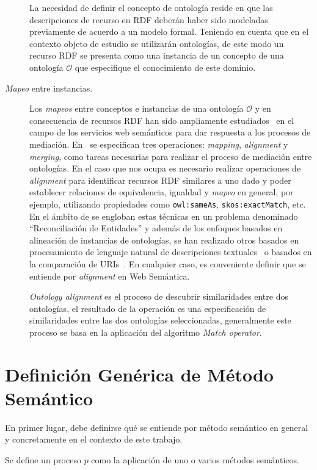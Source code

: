 \begin{description}
La necesidad de definir el concepto de ontología reside en que las descripciones de recurso en RDF deberán
haber sido modeladas previamente de acuerdo a un modelo formal. Teniendo en cuenta que en el contexto objeto de estudio se utilizarán
ontologías, de este modo un recurso RDF se presenta como una instancia de un concepto de una ontología $\mathcal{O}$ que 
especifique el conocimiento de este dominio.

\item [\textit{Mapeo} entre instancias.] Los \textit{mapeos} entre conceptos e instancias de una ontología $\mathcal{O}$ y en consecuencia
de recursos RDF han sido ampliamente estudiados~\cite{NM00} en el campo de los servicios web semánticos para dar respuesta a
los procesos de mediación. En~\cite{Bruijin2006} se especifican tres operaciones: \textit{mapping}, \textit{alignment} y \textit{merging}, 
como tareas necesarias para realizar el proceso de mediación entre ontologías. En el caso que nos ocupa
es necesario realizar operaciones de \textit{alignment} para identificar recursos RDF similares a uno dado y poder establecer
relaciones de equivalencia, igualdad y \textit{mapeo} en general, por ejemplo, utilizando propiedades como \texttt{owl:sameAs}, \texttt{skos:exactMatch}, 
etc. En el ámbito de \lod se engloban estas técnicas en un problema denominado ``Reconciliación de Entidades'' y además de los
enfoques basados en alineación de instancias de ontologías, se han realizado otros basados en
procesamiento de lenguaje natural de descripciones textuales~\cite{Serimi} o basados en la comparación de URIs~\cite{Maali_Cyganiak_2011}.
 En cualquier caso, es conveniente definir que se entiende por \textit{alignment} en Web Semántica.

\textit{Ontology alignment} es el proceso de descubrir similaridades entre
dos ontologías, el resultado de la operación es una especificación de similaridades
entre las dos ontologías seleccionadas, generalmente este proceso se basa en la aplicación
del algoritmo \textit{Match operator}.

\end{description}


\section{Definición Genérica de Método Semántico}
En primer lugar, debe definirse qué se entiende por método semántico en general y concretamente en el contexto
de este trabajo.

\begin{definition}[Proceso $p$]
Se define un proceso $p$ como la aplicación de uno o varios métodos semánticos. 
\end{definition}


